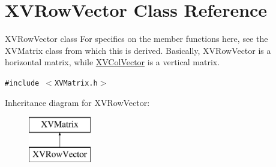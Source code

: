 \hypertarget{class_XVRowVector}{
\section{XVRow\-Vector  Class Reference}
\label{XVRowVector}
}
XVRow\-Vector class For specifics on the member functions here, see the XVMatrix class from which this is derived. Basically, XVRow\-Vector is a horizontal matrix, while \hyperlink{class_XVColVector}{XVCol\-Vector} is a vertical matrix. 


{\tt \#include $<$XVMatrix.h$>$}

Inheritance diagram for XVRow\-Vector:\begin{figure}[H]
\begin{center}
\leavevmode
\includegraphics[height=2cm]{class_XVRowVector}
\end{center}
\end{figure}

